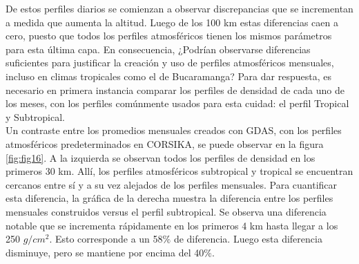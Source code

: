 De estos perfiles diarios se comienzan a observar discrepancias que se incrementan a medida que aumenta la altitud. Luego de los 100 km estas diferencias caen a cero, puesto que todos los perfiles atmosféricos tienen los mismos parámetros para esta última capa. En consecuencia, ¿Podrían observarse diferencias suficientes para justificar la creación y uso de perfiles atmosféricos mensuales, incluso en climas tropicales como el de Bucaramanga? Para dar respuesta, es necesario en primera instancia comparar los perfiles de densidad de cada uno de los meses, con los perfiles comúnmente usados para esta cuidad: el perfil Tropical y Subtropical. \\

Un contraste entre los promedios mensuales creados con GDAS, con los perfiles atmosféricos predeterminados en CORSIKA, se puede observar en la figura \ref{fig:fig16}. A la izquierda se observan todos los perfiles de densidad en los primeros 30 km. Allí, los perfiles atmosféricos subtropical y tropical se encuentran cercanos entre sí y a su vez alejados de los perfiles mensuales. Para cuantificar esta diferencia, la gráfica de la derecha muestra la diferencia entre los perfiles mensuales construidos versus el perfil subtropical. Se observa una diferencia notable que se incrementa rápidamente en los primeros 4 km hasta llegar a los 250 $g/cm^{2}$. Esto corresponde a un 58$\%$ de diferencia. Luego esta diferencia  disminuye, pero se mantiene por encima del 40$\%$.
